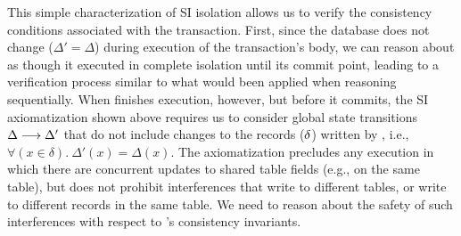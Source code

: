 
\noindent This simple characterization of SI isolation allows us to
verify the consistency conditions associated with the 
transaction.  First, since the database does not change ($\Delta' =
\Delta$) during execution of the transaction's body, we can reason
about  as though it executed in complete isolation until
its commit point, leading to a verification process similar to what
would been applied when reasoning sequentially.  When 
finishes execution, however, but before it commits, the SI
axiomatization shown above requires us to consider global state
transitions $\Delta \longrightarrow \Delta'$ that do not include changes
to the records ($\delta$) written by , i.e.,
$\forall(x\in\delta).~\Delta'(x) = \Delta(x)$.  The axiomatization
precludes any execution in which there are concurrent updates to
shared table fields (e.g.,  on the same 
table), but does not prohibit interferences that write to different
tables, or write to different records in the same table.  We need to
reason about the safety of such interferences with respect to
's consistency invariants.

